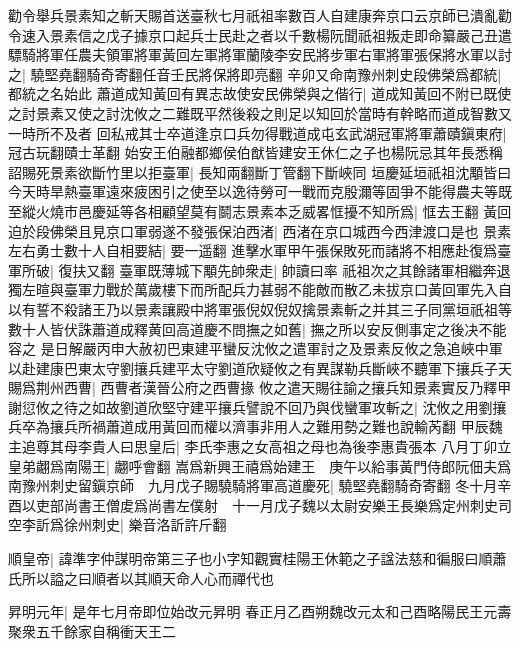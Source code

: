 勸令舉兵景素知之斬天賜首送臺秋七月祇祖率數百人自建康奔京口云京師已潰亂勸令速入景素信之戊子據京口起兵士民赴之者以千數楊阮聞祇祖叛走即命纂嚴己丑遣驃騎將軍任農夫領軍將軍黃回左軍將軍蘭陵李安民將步軍右軍將軍張保將水軍以討之|{
	驍堅堯翻騎奇寄翻任音壬民將保將即亮翻}
辛卯又命南豫州刺史段佛榮爲都統|{
	都統之名始此}
蕭道成知黃回有異志故使安民佛榮與之偕行|{
	道成知黃回不附已既使之討景素又使之討沈攸之二難既平然後殺之則足以知回於當時有幹略而道成智數又一時所不及者}
回私戒其士卒道逢京口兵勿得戰道成屯玄武湖冠軍將軍蕭賾鎭東府|{
	冠古玩翻賾士革翻}
始安王伯融都鄉侯伯猷皆建安王休仁之子也楊阮忌其年長悉稱詔賜死景素欲斷竹里以拒臺軍|{
	長知兩翻斷丁管翻下斷峽同}
垣慶延垣祇祖沈顒皆曰今天時旱熱臺軍遠來疲困引之使至以逸待勞可一戰而克殷濔等固爭不能得農夫等既至縱火燒市邑慶延等各相顧望莫有鬬志景素本乏威畧恇擾不知所爲|{
	恇去王翻}
黃回迫於段佛榮且見京口軍弱遂不發張保泊西渚|{
	西渚在京口城西今西津渡口是也}
景素左右勇士數十人自相要結|{
	要一遥翻}
進擊水軍甲午張保敗死而諸將不相應赴復爲臺軍所破|{
	復扶又翻}
臺軍既薄城下顒先帥衆走|{
	帥讀曰率}
祇祖次之其餘諸軍相繼奔退獨左暄與臺軍力戰於萬歲樓下而所配兵力甚弱不能敵而散乙未拔京口黃回軍先入自以有誓不殺諸王乃以景素讓殿中將軍張倪奴倪奴擒景素斬之并其三子同黨垣祇祖等數十人皆伏誅蕭道成釋黄回高道慶不問撫之如舊|{
	撫之所以安反側事定之後决不能容之}
是日解嚴丙申大赦初巴東建平蠻反沈攸之遣軍討之及景素反攸之急追峽中軍以赴建康巴東太守劉攘兵建平太守劉道欣疑攸之有異謀勒兵斷峽不聽軍下攘兵子天賜爲荆州西曹|{
	西曹者漢晉公府之西曹掾}
攸之遣天賜往諭之攘兵知景素實反乃釋甲謝愆攸之待之如故劉道欣堅守建平攘兵譬說不回乃與伐蠻軍攻斬之|{
	沈攸之用劉攘兵卒為攘兵所禍蕭道成用黃回而權以濟事非用人之難用勢之難也說輸芮翻}
甲辰魏主追尊其母李貴人曰思皇后|{
	李氏李惠之女高祖之母也為後李惠貴張本}
八月丁卯立皇弟翽爲南陽王|{
	翽呼會翻}
嵩爲新興王禧爲始建王　庚午以給事黃門侍郎阮佃夫爲南豫州刺史留鎭京師　九月戊子賜驍騎將軍高道慶死|{
	驍堅堯翻騎奇寄翻}
冬十月辛酉以吏部尚書王僧䖍爲尚書左僕射　十一月戊子魏以太尉安樂王長樂爲定州刺史司空李訢爲徐州刺史|{
	樂音洛訢許斤翻}


順皇帝|{
	諱準字仲謀明帝第三子也小字知觀實桂陽王休範之子諡法慈和徧服曰順蕭氏所以謚之曰順者以其順天命人心而禪代也}


昇明元年|{
	是年七月帝即位始改元昇明}
春正月乙酉朔魏改元太和己酉略陽民王元壽聚衆五千餘家自稱衝天王二

